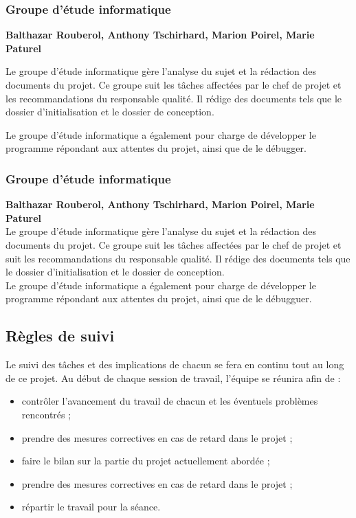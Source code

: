\subsubsection{Groupe d'étude informatique}
\textbf{Balthazar Rouberol, Anthony Tschirhard, Marion Poirel, Marie Paturel}

Le groupe d'étude informatique gère l'analyse du sujet et la rédaction des documents du projet. Ce groupe suit les tâches affectées par le chef de projet et les recommandations du responsable qualité. Il rédige des documents tels que le dossier d'initialisation et le dossier de conception.

Le groupe d'étude informatique a également pour charge de développer le programme répondant aux attentes du projet, ainsi que de le débugger.


\subsubsection{Groupe d'étude informatique}
\textbf{Balthazar Rouberol, Anthony Tschirhard, Marion Poirel, Marie Paturel}\\
Le groupe d'étude informatique gère l'analyse du sujet et la rédaction des documents du projet. Ce groupe suit les tâches affectées par le chef de projet et suit les recommandations du responsable qualité. Il rédige des documents tels que le dossier d'initialisation et le dossier de conception.\\
Le groupe d'étude informatique a également pour charge de développer le programme répondant aux attentes du projet, ainsi que de le débugguer.


\subsection{Règles de suivi}
Le suivi des tâches et des implications de chacun se fera en continu tout au long de ce projet. Au début de chaque session de travail, l'équipe se réunira afin de :
\begin{itemize}
  \item contrôler l'avancement du travail de chacun et les éventuels problèmes rencontrés ;
  \item prendre des mesures correctives en cas de retard dans le projet ;
  \item faire le bilan sur la partie du projet actuellement abordée ;
  \item prendre des mesures correctives en cas de retard dans le projet ;
  \item répartir le travail pour la séance.
\end{itemize}

